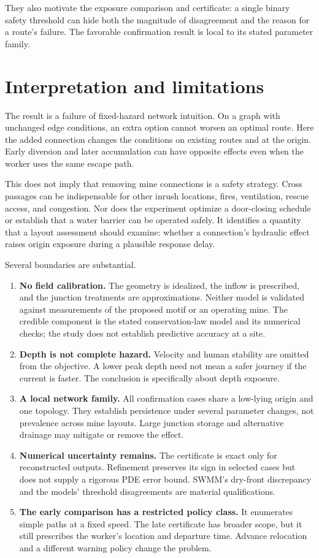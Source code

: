 \documentclass[11pt]{article}
\begin{document}
They also motivate the exposure comparison and certificate: a single binary safety threshold can hide both the magnitude of disagreement and the reason for a route's failure. The favorable confirmation result is local to its stated parameter family.

\section{Interpretation and limitations}
The result is a failure of fixed-hazard network intuition. On a graph with unchanged edge conditions, an extra option cannot worsen an optimal route. Here the added connection changes the conditions on existing routes and at the origin. Early diversion and later accumulation can have opposite effects even when the worker uses the same escape path.

This does not imply that removing mine connections is a safety strategy. Cross passages can be indispensable for other inrush locations, fires, ventilation, rescue access, and congestion. Nor does the experiment optimize a door-closing schedule or establish that a water barrier can be operated safely. It identifies a quantity that a layout assessment should examine: whether a connection's hydraulic effect raises origin exposure during a plausible response delay.

Several boundaries are substantial.
\begin{enumerate}
\item \textbf{No field calibration.} The geometry is idealized, the inflow is prescribed, and the junction treatments are approximations. Neither model is validated against measurements of the proposed motif or an operating mine. The credible component is the stated conservation-law model and its numerical checks; the study does not establish predictive accuracy at a site.
\item \textbf{Depth is not complete hazard.} Velocity and human stability are omitted from the objective. A lower peak depth need not mean a safer journey if the current is faster. The conclusion is specifically about depth exposure.
\item \textbf{A local network family.} All confirmation cases share a low-lying origin and one topology. They establish persistence under several parameter changes, not prevalence across mine layouts. Large junction storage and alternative drainage may mitigate or remove the effect.
\item \textbf{Numerical uncertainty remains.} The certificate is exact only for reconstructed outputs. Refinement preserves its sign in selected cases but does not supply a rigorous PDE error bound. SWMM's dry-front discrepancy and the models' threshold disagreements are material qualifications.
\item \textbf{The early comparison has a restricted policy class.} It enumerates simple paths at a fixed speed. The late certificate has broader scope, but it still prescribes the worker's location and departure time. Advance relocation and a different warning policy change the problem.
\end{enumerate}
\end{document}
